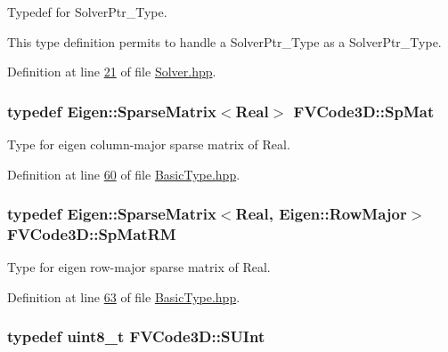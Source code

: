 Typedef for Solver\+Ptr\+\_\+\+Type. 

This type definition permits to handle a Solver\+Ptr\+\_\+\+Type as a Solver\+Ptr\+\_\+\+Type. 

Definition at line \hyperlink{Solver_8hpp_source_l00021}{21} of file \hyperlink{Solver_8hpp_source}{Solver.\+hpp}.

\subsubsection[{\texorpdfstring{Sp\+Mat}{SpMat}}]{\setlength{\rightskip}{0pt plus 5cm}typedef Eigen\+::\+Sparse\+Matrix$<${\bf Real}$>$ {\bf F\+V\+Code3\+D\+::\+Sp\+Mat}}\hypertarget{namespaceFVCode3D_ac1032289d96638cf0ad6c52ef639095f}{}\label{namespaceFVCode3D_ac1032289d96638cf0ad6c52ef639095f}


Type for eigen column-\/major sparse matrix of Real. 



Definition at line \hyperlink{BasicType_8hpp_source_l00060}{60} of file \hyperlink{BasicType_8hpp_source}{Basic\+Type.\+hpp}.

\subsubsection[{\texorpdfstring{Sp\+Mat\+RM}{SpMatRM}}]{\setlength{\rightskip}{0pt plus 5cm}typedef Eigen\+::\+Sparse\+Matrix$<${\bf Real}, Eigen\+::\+Row\+Major$>$ {\bf F\+V\+Code3\+D\+::\+Sp\+Mat\+RM}}\hypertarget{namespaceFVCode3D_a43d700a82a0a7ea1a4ad9768c59dc536}{}\label{namespaceFVCode3D_a43d700a82a0a7ea1a4ad9768c59dc536}


Type for eigen row-\/major sparse matrix of Real. 



Definition at line \hyperlink{BasicType_8hpp_source_l00063}{63} of file \hyperlink{BasicType_8hpp_source}{Basic\+Type.\+hpp}.

\subsubsection[{\texorpdfstring{S\+U\+Int}{SUInt}}]{\setlength{\rightskip}{0pt plus 5cm}typedef uint8\+\_\+t {\bf F\+V\+Code3\+D\+::\+S\+U\+Int}}\hypertarget{namespaceFVCode3D_a0319e74922d1d700fbc06e470e0cfc07}{}\label{namespaceFVCode3D_a0319e74922d1d700fbc06e470e0cfc07}


